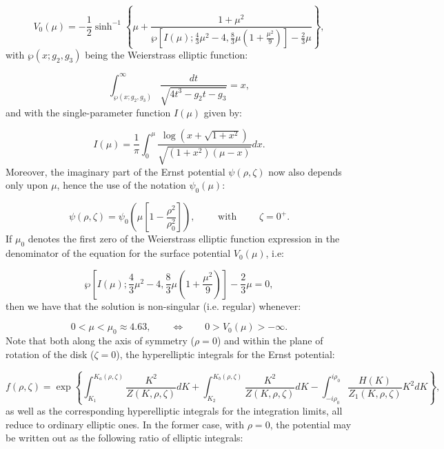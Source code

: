 \documentclass{article}
\begin{document}
\begin{equation}
V_0 \left( \mu \right) = - \frac{1}{2} \sinh^{-1} \left\lbrace \mu + \frac{1 + \mu^2}{\wp \left[ I \left( \mu \right) ; \frac{4}{3} \mu^2 - 4, \frac{8}{3} \mu \left( 1 + \frac{\mu^2}{9} \right) \right] - \frac{2}{3} \mu} \right\rbrace,
\end{equation}
with ${\wp \left( x ; g_2, g_3 \right)}$ being the Weierstrass elliptic function:

\begin{equation}
\int_{\wp \left( x; g_2, g_3 \right)}^{\infty} \frac{dt}{\sqrt{4 t^3 - g_2 t - g_3}} = x,
\end{equation}
and with the single-parameter function ${I \left( \mu \right)}$ given by:

\begin{equation}
I \left( \mu \right) = \frac{1}{\pi} \int_{0}^{\mu} \frac{\log \left( x + \sqrt{1 + x^2} \right)}{\sqrt{\left( 1 + x^2 \right) \left( \mu - x \right)}} dx.
\end{equation}
Moreover, the imaginary part of the Ernst potential ${\psi \left( \rho, \zeta \right)}$ now also depends only upon ${\mu}$, hence the use of the notation ${\psi_0 \left( \mu \right)}$:

\begin{equation}
\psi \left( \rho, \zeta \right) = \psi_0 \left( \mu \left[ 1 - \frac{\rho^2}{\rho_{0}^{2}} \right] \right), \qquad \text{ with } \qquad \zeta = 0^{+}.
\end{equation}
If ${\mu_0}$ denotes the first zero of the Weierstrass elliptic function expression in the denominator of the equation for the surface potential ${V_0 \left( \mu \right)}$, i.e:

\begin{equation}
\wp \left[ I \left( \mu \right) ; \frac{4}{3} \mu^2 - 4, \frac{8}{3} \mu \left( 1 + \frac{\mu^2}{9} \right) \right] - \frac{2}{3} \mu = 0,
\end{equation}
then we have that the solution is non-singular (i.e. regular) whenever:

\begin{equation}
0 < \mu < \mu_0 \approx 4.63, \qquad \iff \qquad 0 > V_0 \left( \mu \right) > - \infty.
\end{equation}
Note that both along the axis of symmetry (${\rho = 0}$) and within the plane of rotation of the disk (${\zeta = 0}$), the hyperelliptic integrals for the Ernst potential:

\begin{equation}
f \left( \rho, \zeta \right) = \exp \left\lbrace \int_{K_1}^{K_a \left( \rho, \zeta \right)} \frac{K^2}{Z \left( K, \rho, \zeta \right)} dK + \int_{K_2}^{K_b \left( \rho, \zeta \right)} \frac{K^2}{Z \left( K, \rho, \zeta \right)} dK - \int_{- i \rho_0}^{i \rho_0} \frac{H \left( K \right)}{Z_1 \left( K, \rho, \zeta \right)} K^2 dK \right\rbrace,
\end{equation}
as well as the corresponding hyperelliptic integrals for the integration limits, all reduce to ordinary elliptic ones. In the former case, with ${\rho = 0}$, the potential may be written out as the following ratio of elliptic integrals:
\end{document}
